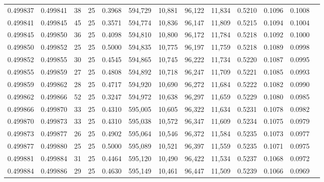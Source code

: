 \begin{tabular}{rrrrrrrrrrrrr}
0.499837 & 0.499841 &    38 &  25 &                                     0.3968 & 594,729 &  10,881 &  96,122 &  11,834 & 0.5210 & 0.1096 & 0.1008 \\
0.499841 & 0.499845 &    45 &  25 &                                     0.3571 & 594,774 &  10,836 &  96,147 &  11,809 & 0.5215 & 0.1094 & 0.1004 \\
0.499845 & 0.499850 &    36 &  25 &                                     0.4098 & 594,810 &  10,800 &  96,172 &  11,784 & 0.5218 & 0.1092 & 0.1000 \\
0.499850 & 0.499852 &    25 &  25 &                                     0.5000 & 594,835 &  10,775 &  96,197 &  11,759 & 0.5218 & 0.1089 & 0.0998 \\
0.499852 & 0.499855 &    30 &  25 &                                     0.4545 & 594,865 &  10,745 &  96,222 &  11,734 & 0.5220 & 0.1087 & 0.0995 \\
0.499855 & 0.499859 &    27 &  25 &                                     0.4808 & 594,892 &  10,718 &  96,247 &  11,709 & 0.5221 & 0.1085 & 0.0993 \\
0.499859 & 0.499862 &    28 &  25 &                                     0.4717 & 594,920 &  10,690 &  96,272 &  11,684 & 0.5222 & 0.1082 & 0.0990 \\
0.499862 & 0.499866 &    52 &  25 &                                     0.3247 & 594,972 &  10,638 &  96,297 &  11,659 & 0.5229 & 0.1080 & 0.0985 \\
0.499866 & 0.499870 &    33 &  25 &                                     0.4310 & 595,005 &  10,605 &  96,322 &  11,634 & 0.5231 & 0.1078 & 0.0982 \\
0.499870 & 0.499873 &    33 &  25 &                                     0.4310 & 595,038 &  10,572 &  96,347 &  11,609 & 0.5234 & 0.1075 & 0.0979 \\
0.499873 & 0.499877 &    26 &  25 &                                     0.4902 & 595,064 &  10,546 &  96,372 &  11,584 & 0.5235 & 0.1073 & 0.0977 \\
0.499877 & 0.499880 &    25 &  25 &                                     0.5000 & 595,089 &  10,521 &  96,397 &  11,559 & 0.5235 & 0.1071 & 0.0975 \\
0.499881 & 0.499884 &    31 &  25 &                                     0.4464 & 595,120 &  10,490 &  96,422 &  11,534 & 0.5237 & 0.1068 & 0.0972 \\
0.499884 & 0.499886 &    29 &  25 &                                     0.4630 & 595,149 &  10,461 &  96,447 &  11,509 & 0.5239 & 0.1066 & 0.0969 \\

\end{tabular}
